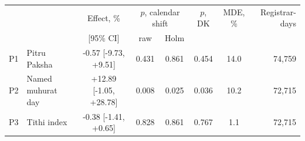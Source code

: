 \begin{tabular}{llcccccr}
\toprule
 & & Effect, \% & \multicolumn{2}{c}{$p$, calendar shift} & $p$, DK & MDE, \% & Registrar-days \\
 & & [95\% CI] & raw & Holm & & & \\
\midrule
P1 & Pitru Paksha & -0.57 [-9.73, +9.51] & 0.431 & 0.861 & 0.454 & 14.0 & 74,759 \\
P2 & Named muhurat day & +12.89 [-1.05, +28.78] & 0.008 & 0.025 & 0.036 & 10.2 & 72,715 \\
P3 & Tithi index & -0.38 [-1.41, +0.65] & 0.828 & 0.861 & 0.767 & 1.1 & 72,715 \\
\bottomrule
\end{tabular}
